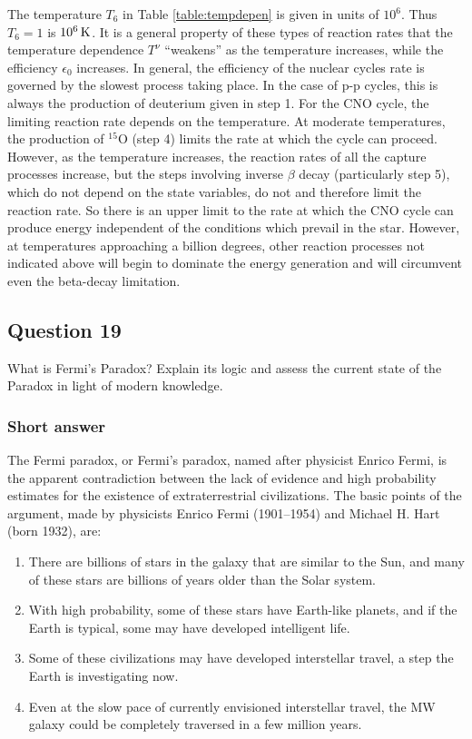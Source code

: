 \documentclass[a4paper,10pt]{article}
\begin{document}
{\noindent}The temperature $T_6$ in Table \ref{table:tempdepen} is given in units of $10^6$. Thus $T_6=1$ is $10^6\,{\rm K}$. It is a general property of these types of reaction rates that the temperature dependence $T^\nu$ ``weakens'' as the temperature increases, while the efficiency $\epsilon_0$ increases. In general, the efficiency of the nuclear cycles rate is governed by the slowest process taking place. In the case of p-p cycles, this is always the production of deuterium given in step 1. For the CNO cycle, the limiting reaction rate depends on the temperature. At moderate temperatures, the production of $^{15}$O (step 4) limits the rate at which the cycle can proceed. However, as the temperature increases, the reaction rates of all the capture processes increase, but the steps involving inverse $\beta$ decay (particularly step 5), which do not depend on the state variables, do not and therefore limit the reaction rate. So there is an upper limit to the rate at which the CNO cycle can produce energy independent of the conditions which prevail in the star. However, at temperatures approaching a billion degrees, other reaction processes not indicated above will begin to dominate the energy generation and will circumvent even the beta-decay limitation.


\newpage
\subsection{Question 19}

What is Fermi's Paradox? Explain its logic and assess the current state of the Paradox in light of modern knowledge.

\subsubsection{Short answer}

The Fermi paradox, or Fermi's paradox, named after physicist Enrico Fermi, is the apparent contradiction between the lack of evidence and high probability estimates for the existence of extraterrestrial civilizations. The basic points of the argument, made by physicists Enrico Fermi (1901–1954) and Michael H. Hart (born 1932), are:

\begin{enumerate}
    \item There are billions of stars in the galaxy that are similar to the Sun, and many of these stars are billions of years older than the Solar system.
    \item With high probability, some of these stars have Earth-like planets, and if the Earth is typical, some may have developed intelligent life.
    \item Some of these civilizations may have developed interstellar travel, a step the Earth is investigating now.
    \item Even at the slow pace of currently envisioned interstellar travel, the MW galaxy could be completely traversed in a few million years.
\end{enumerate}
\end{document}
